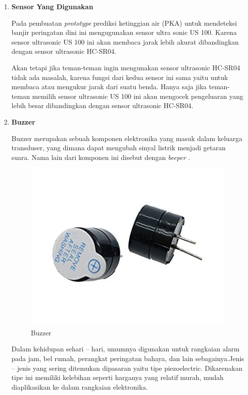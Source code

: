 \begin{enumerate}
\item \textbf{Sensor Yang Digunakan}\\
\par Pada pembuatan \textit{prototype} prediksi ketinggian air (PKA) untuk mendeteksi banjir peringatan dini ini mengugunakan sensor ultra sonic US 100. Karena sensor ultrasonic US 100 ini akan membaca jarak lebih akurat dibandingkan dengan sensor ultrasonic HC-SR04.

\par Akan tetapi jika teman-teman ingin mengunakan sensor ultrasonic HC-SR04 tidak ada masalah, karena fungsi dari kedua sensor ini sama yaitu untuk membaca atau mengukur jarak dari suatu benda. Hanya saja jika teman-teman memilih sensor ultrasonic US 100 ini akan mengocek pengeluaran yang lebih besar dibandingkan dengan sensor ultrasonic HC-SR04.

\item \textbf{Buzzer}
\par Buzzer merupakan sebuah komponen elektronika yang masuk dalam keluarga transduser, yang dimana dapat mengubah sinyal listrik menjadi getaran suara. Nama lain dari komponen ini disebut dengan \textit{beeper} .
\begin{figure}[H]
\centering
\includegraphics[width=1\textwidth]{figures/buzzer.jpg}
\caption{Buzzer}
\label{print}
\end{figure}

\par Dalam kehidupan sehari – hari, umumnya digunakan untuk rangkaian alarm pada jam, bel rumah, perangkat peringatan bahaya, dan lain sebagainya.Jenis – jenis yang sering ditemukan dipasaran yaitu tipe piezoelectric. Dikarenakan tipe ini memiliki kelebihan seperti harganya yang relatif murah, mudah diaplikasikan ke dalam rangkaian elektronika.


\end{enumerate}
